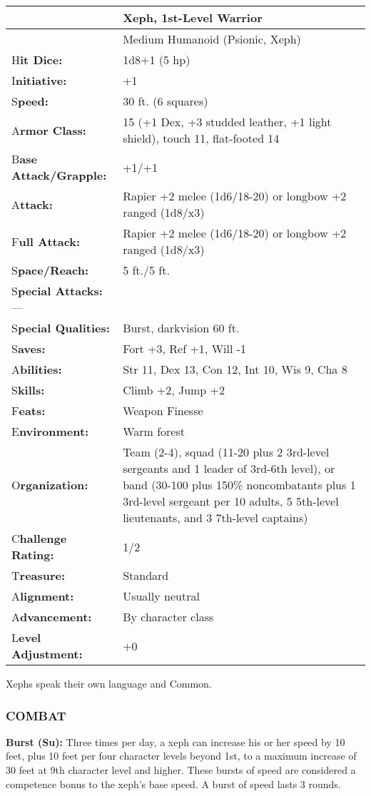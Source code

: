 \documentclass{article}
\begin{document}
\begin{tabular}{|>{\raggedright}p{81pt}|>{\raggedright}p{244pt}|}
\hline
  & Xeph, 1st-Level Warrior\tabularnewline
\hline
 & Medium Humanoid (Psionic, Xeph)\tabularnewline
\hline
H\textbf{it Dice:} & 1d8+1 (5 hp)\tabularnewline
\hline
I\textbf{nitiative:} & +1\tabularnewline
\hline
S\textbf{peed:} & 30 ft. (6 squares)\tabularnewline
\hline
A\textbf{rmor Class:} & 15 (+1 Dex, +3 studded leather, +1 light shield), touch 
11, flat-footed 14\tabularnewline
\hline
B\textbf{ase Attack/Grapple:} & +1/+1\tabularnewline
\hline
A\textbf{ttack:} & Rapier +2 melee (1d6/18-20) or longbow +2 ranged (1d8/x3)\tabularnewline
\hline
F\textbf{ull Attack:} & Rapier +2 melee (1d6/18-20) or longbow +2 ranged (1d8/x3) 
\tabularnewline
\hline
S\textbf{pace/Reach:} & 5 ft./5 ft.\tabularnewline
\hline
S\textbf{pecial Attacks:}--- & \tabularnewline
\hline
S\textbf{pecial Qualities:} & Burst, darkvision 60 ft.\tabularnewline
\hline
S\textbf{aves:} & Fort +3, Ref +1, Will -1\tabularnewline
\hline
A\textbf{bilities:} & Str 11, Dex 13, Con 12, Int 10, Wis 9, Cha 8\tabularnewline
\hline
S\textbf{kills:} & Climb +2, Jump +2\tabularnewline
\hline
F\textbf{eats:} & Weapon Finesse\tabularnewline
\hline
E\textbf{nvironment:} & Warm forest\tabularnewline
\hline
O\textbf{rganization:} & Team (2-4), squad (11-20 plus 2 3rd-level sergeants and 
1 leader of 3rd-6th level), or band (30-100 plus 150\% noncombatants plus 1 3rd-level 
sergeant per 10 adults, 5 5th-level lieutenants, and 3 7th-level captains)\tabularnewline
\hline
C\textbf{hallenge Rating:} & 1/2\tabularnewline
\hline
T\textbf{reasure:} & Standard\tabularnewline
\hline
A\textbf{lignment:} & Usually neutral\tabularnewline
\hline
A\textbf{dvancement:} & By character class\tabularnewline
\hline
L\textbf{evel Adjustment:} & +0\tabularnewline
\hline
\end{tabular}

Xephs speak their own language and Common.

\subsubsection*{COMBAT}

\textbf{Burst (Su):} Three times per day, a xeph can increase his or her speed 
by 10 feet, plus 10 feet per four character levels beyond 1st, to a maximum increase 
of 30 feet at 9th character level and higher. These bursts of speed are considered 
a competence bonus to the xeph's base speed. A burst of speed lasts 3 rounds.
\end{document}
